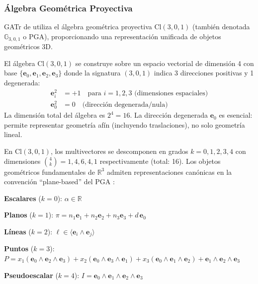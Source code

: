 \subsubsection{Álgebra Geométrica Proyectiva}

GATr de \citet{brehmer2023geometric} utiliza el álgebra geométrica proyectiva $\text{Cl}(3,0,1)$ (también denotada $\mathbb{G}_{3,0,1}$ o PGA), proporcionando una representación unificada de objetos geométricos 3D.

\begin{definition}\label{def:algebra_proyectiva_3d}
El álgebra $\text{Cl}(3,0,1)$ se construye sobre un espacio vectorial de dimensión 4 con base $\{\mathbf{e}_0, \mathbf{e}_1, \mathbf{e}_2, \mathbf{e}_3\}$ donde la signatura $(3,0,1)$ indica 3 direcciones positivas y 1 degenerada:
\begin{align}
    \mathbf{e}_i^2 &= +1 \quad \text{para } i = 1,2,3 \text{ (dimensiones espaciales)} \\
    \mathbf{e}_0^2 &= 0 \quad \text{(dirección degenerada/nula)}
\end{align}
La dimensión total del álgebra es $2^4 = 16$. La dirección degenerada $\mathbf{e}_0$ es esencial: permite representar geometría afín (incluyendo traslaciones), no solo geometría lineal.
\end{definition}

\begin{proposition}\label{prop:representacion_unificada_gatr}
En $\text{Cl}(3,0,1)$, los multivectores se descomponen en grados $k = 0, 1, 2, 3, 4$ con dimensiones $\binom{4}{k} = 1, 4, 6, 4, 1$ respectivamente (total: 16). Los objetos geométricos fundamentales de $\mathbb{R}^3$ admiten representaciones canónicas en la convención ``plane-based'' del PGA \citep{brehmer2023geometric}:

\textbf{Escalares} ($k=0$): $\alpha \in \mathbb{R}$

\textbf{Planos} ($k=1$): $\pi = n_1 \mathbf{e}_1 + n_2 \mathbf{e}_2 + n_3 \mathbf{e}_3 + d\, \mathbf{e}_0$

\textbf{Líneas} ($k=2$): $\ell \in \langle \mathbf{e}_i \wedge \mathbf{e}_j \rangle$

\textbf{Puntos} ($k=3$): $P = x_1 (\mathbf{e}_0 \wedge \mathbf{e}_2 \wedge \mathbf{e}_3) + x_2 (\mathbf{e}_0 \wedge \mathbf{e}_3 \wedge \mathbf{e}_1) + x_3 (\mathbf{e}_0 \wedge \mathbf{e}_1 \wedge \mathbf{e}_2) + \mathbf{e}_1 \wedge \mathbf{e}_2 \wedge \mathbf{e}_3$

\textbf{Pseudoescalar} ($k=4$): $I = \mathbf{e}_0 \wedge \mathbf{e}_1 \wedge \mathbf{e}_2 \wedge \mathbf{e}_3$
\end{proposition}

